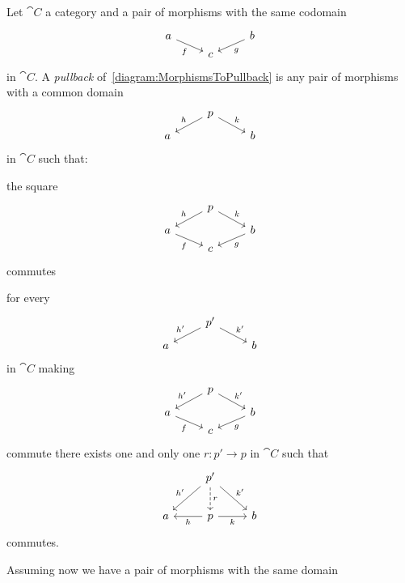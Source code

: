 \begin{definition}
Let \(\cat C\) a category and a pair of morphisms with the same codomain
\begin{equation}
\begin{tikzcd}[row sep=tiny]
a \ar["f", dr, swap] &   & b \ar["g", dl] \\
                     & c &
\end{tikzcd}
\label{diagram:MorphismsToPullback}\end{equation}
in \(\cat C\). A {\em pullback} of~\eqref{diagram:MorphismsToPullback} is any pair of morphisms with a common domain
\[\begin{tikzcd}[row sep=tiny]
  & p \ar["h", dl, swap] \ar["k", dr] &   \\
a &                                   & b
\end{tikzcd}\]
in \(\cat C\) such that:
\begin{tcbitem}
\item the square
\[\begin{tikzcd}[row sep=tiny]
  & p \ar["h", dl, swap] \ar["k", dr] &   \\
a \ar["f", dr, swap] &   & b \ar["g", dl] \\
                     & c &
\end{tikzcd}\]
commutes
\item for every
\[\begin{tikzcd}[row sep=tiny]
  & p' \ar["{h'}", dl, swap] \ar["{k'}", dr] &   \\
a &                                          & b
\end{tikzcd}\]
in \(\cat C\)
making
\[\begin{tikzcd}[row sep=tiny]
  & p \ar["{h'}", dl, swap] \ar["{k'}", dr] &   \\
a \ar["f", dr, swap] &   & b \ar["g", dl] \\
                     & c &
\end{tikzcd}\]
commute there exists one and only one \(r : p' \to p\) in \(\cat C\) such that
\[\begin{tikzcd}
& p' \ar["{h'}", dl, swap] \ar["r", d, dashed] \ar["{k'}", dr] & \\
a & p \ar["h", l] \ar["k", r, swap] & b
\end{tikzcd}\]
commutes.
\end{tcbitem}
Assuming now we have a pair of morphisms with the same domain
\begin{equation}

\end{equation}
\end{definition}
